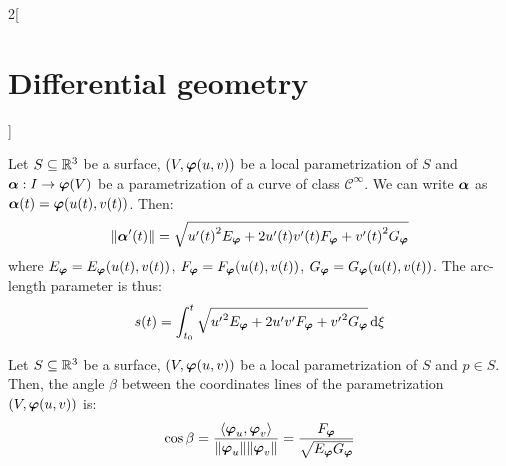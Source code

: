 \documentclass[../../../main_math.tex]{subfiles}
\begin{document}
\begin{multicols}{2}[\section{Differential geometry}]
\begin{definition}
  \end{definition}
  \begin{proposition}
    Let $S\subseteq\mathbb{R}^3$ be a surface, $(V,\boldsymbol{\mathrm{\varphi}}(u,v))$ be a local parametrization of $S$ and $\boldsymbol{\mathrm{\alpha}}:I\rightarrow\boldsymbol{\mathrm{\varphi}}(V)$ be a parametrization of a curve of class $\mathcal{C}^\infty$. We can write $\boldsymbol{\mathrm{\alpha}}$ as $\boldsymbol{\mathrm{\alpha}}(t)=\boldsymbol{\mathrm{\varphi}}(u(t),v(t))$. Then:
    $$\|\boldsymbol{\mathrm{\alpha}}'(t)\|=\sqrt{{u'(t)}^2 E_{\boldsymbol{\mathrm{\varphi}}}+2u'(t)v'(t) F_{\boldsymbol{\mathrm{\varphi}}}+{v'(t)}^2G_{\boldsymbol{\mathrm{\varphi}}}}$$ where $E_{\boldsymbol{\mathrm{\varphi}}}=E_{\boldsymbol{\mathrm{\varphi}}}(u(t),v(t))$, $F_{\boldsymbol{\mathrm{\varphi}}}=F_{\boldsymbol{\mathrm{\varphi}}}(u(t),v(t))$, $G_{\boldsymbol{\mathrm{\varphi}}}=G_{\boldsymbol{\mathrm{\varphi}}}(u(t),v(t))$. The arc-length parameter is thus:
    $$s(t)=\int_{t_0}^t\sqrt{{u'}^2 E_{\boldsymbol{\mathrm{\varphi}}}+2u'v' F_{\boldsymbol{\mathrm{\varphi}}}+{v'}^2G_{\boldsymbol{\mathrm{\varphi}}}}\dd{\xi}$$
  \end{proposition}
  \begin{proposition}
    Let $S\subseteq\mathbb{R}^3$ be a surface, $(V,\boldsymbol{\mathrm{\varphi}}(u,v))$ be a local parametrization of $S$ and $p\in S$. Then, the angle $\beta$ between the coordinates lines of the parametrization $(V,\boldsymbol{\mathrm{\varphi}}(u,v))$ is: $$\cos\beta=\frac{\langle\boldsymbol{\mathrm{\varphi}}_u,\boldsymbol{\mathrm{\varphi}}_v\rangle}{\|\boldsymbol{\mathrm{\varphi}}_u\|\|\boldsymbol{\mathrm{\varphi}}_v\|}=\frac{F_{\boldsymbol{\mathrm{\varphi}}}}{\sqrt{E_{\boldsymbol{\mathrm{\varphi}}}G_{\boldsymbol{\mathrm{\varphi}}}}}$$
  \end{proposition}

\end{multicols}
\end{document}
